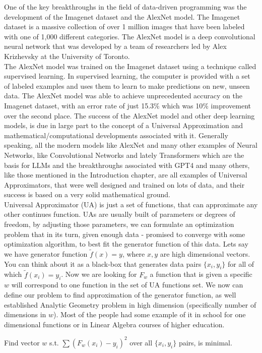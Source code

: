 \documentclass{article}
\begin{document}
One of the key breakthroughs in the field of data-driven programming was the development of the Imagenet dataset\cite{deng2009imagenet} and the AlexNet\cite{krizhevsky2017imagenet} model. The Imagenet dataset is a massive collection of over 1 million images that have been labeled with one of 1,000 different categories. The AlexNet model is a deep convolutional neural network that was developed by a team of researchers led by Alex Krizhevsky at the University of Toronto.\\

The AlexNet model was trained on the Imagenet dataset using a technique called supervised learning\cite{hastie2008elements}. In supervised learning, the computer is provided with a set of labeled examples and uses them to learn to make predictions on new, unseen data. The AlexNet model was able to achieve unprecedented accuracy on the Imagenet dataset, with an error rate of just 15.3\% which was 10\% improvement over the second place\cite{ILSVRC2012}. The success of the AlexNet model and other deep learning models, is due in large part to the concept of a Universal Approximation and mathematical/computational developments associated with it. Generally speaking, all the modern models like AlexNet and many other examples of Neural Networks, like Convolutional Networks and lately Transformers which are the basis for LLMs and the breakthroughs associated with GPT4 and many others, like those mentioned in the Introduction chapter, are all examples of Universal Approximators, that were well designed and trained on lots of data, and their success is based on a very solid mathematical ground.\\

Universal Approximator (UA) is just a set of functions, that can approximate any other continues function. UAs are usually built of parameters or degrees of freedom, by adjusting those parameters, we can formulate an optimization problem that in its turn, given enough data - promised to converge with some optimization algorithm, to best fit the generator function of this data. Lets say we have generator function $\tilde{f}(x) = y$, where $x, y$ are high dimensional vectors. You can think about it as a black-box that generates data pairs $\{x_i, y_i\}$ for all of which $\tilde{f}(x_i) = y_i$. Now we are looking for $F_w$ a function that is given a specific $w$ will correspond to one function in the set of UA functions set. We now can define our problem to find approximation of the generator function, as well established Analytic Geometry problem in high dimension (specifically number of dimensions in $w$). Most of the people had some example of it in school for one dimensional functions or in Linear Algebra courses of higher education. \begin{center}Find vector $w$ s.t. $\sum{(F_w(x_i) - y_i)^2}$ over all $\{x_i, y_i\}$ pairs, is minimal.\end{center}
 
\end{document}
